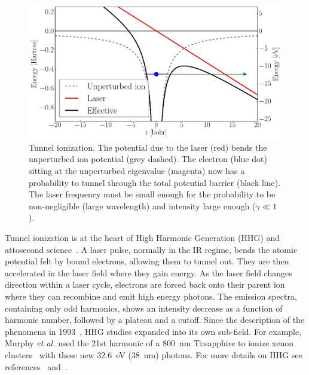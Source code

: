 \begin{figure}
 \centering
 \includegraphics[width=\figurewidth]{figures/ionization_tunnel}
 \caption{\label{fig:ionization:tunnel}Tunnel ionization. The potential
          due to the laser (red) bends the unperturbed ion potential
          (grey dashed). The electron (blue dot) sitting at the unperturbed
          eigenvalue (magenta) now has a probability to tunnel through the total
          potential barrier (black line). The laser frequency must be small
          enough for the probability to be non-negligible (large wavelength)
          and intensity large enough ($\gamma \ll 1$).}
\end{figure}

Tunnel ionization is at the heart of High Harmonic Generation (HHG) and
attosecond science~\cite{Fennel2010}. A laser pulse, normally in the IR regime,
bends the atomic potential felt by bound electrons, allowing them to tunnel
out. They are then accelerated in the laser field where they gain energy.
As the laser field changes direction within a laser cycle, electrons are forced
back onto their parent ion where they can
recombine and emit high energy photons. The emission spectra,
containing only odd harmonics, shows an intensity decrease as a function of
harmonic number, followed by a plateau and a cutoff. Since the description
of the phenomena in 1993~\cite{Corkum1993}, HHG studies expanded into its own
sub-field. For example, Murphy \textit{et al.} used the 21st harmonic of a
800~nm Ti:sapphire to ionize xenon clusters~\cite{Murphy2008a,Murphy2008b}
with these new 32.6~eV (38~nm) photons.
For more details on HHG see references~\cite{Levesque2006}
and~\cite{Lewenstein2008}.


